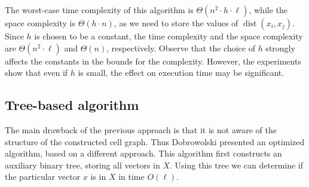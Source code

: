 \documentclass[a4paper]{article}
\DeclareMathOperator{\dist}{dist}
\begin{document}
The worst-case time complexity of this algorithm is $\Theta(n^2 \cdot h \cdot \ell)$, while the space complexity is $\Theta(h \cdot n)$, as we need to store the values of $\dist(x_i,x_j)$. Since $h$ is chosen to be a constant, the time complexity and the space complexity are $\Theta(n^2 \cdot \ell)$ and $\Theta(n)$, respectively. 
Observe that the choice of $h$ strongly affects the constants in the bounds for the complexity. However, the experiments show that even if $h$ is small, the effect on execution time may be significant.


\subsection{Tree-based algorithm}

The main drawback of the previous approach is that it is not aware of the structure of the constructed cell graph. 
Thus Dobrowolski \cite{DBLP:conf/sii/Dobrowolski13} presented an optimized algorithm, based on a different approach. This algorithm first constructs an auxiliary binary tree, storing all vectors in $X$. Using this tree we can determine if the particular vector $x$ is in $X$ in time $O(\ell)$.
\end{document}
